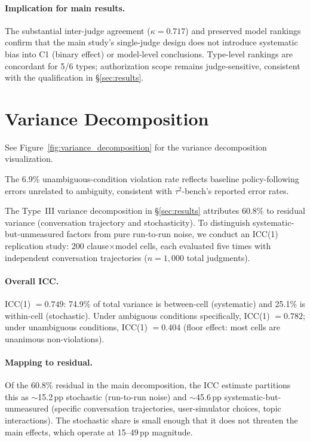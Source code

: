 \paragraph{Implication for main results.} The substantial inter-judge agreement ($\kappa = 0.717$) and preserved model rankings confirm that the main study's single-judge design does not introduce systematic bias into C1 (binary effect) or model-level conclusions. Type-level rankings are concordant for 5/6 types; authorization scope remains judge-sensitive, consistent with the qualification in \S\ref{sec:results}.

\section{Variance Decomposition}
\label{app:variance_fig}
\label{app:residual}

See Figure~\ref{fig:variance_decomposition} for the variance decomposition visualization.

The 6.9\% unambiguous-condition violation rate reflects baseline policy-following errors unrelated to ambiguity, consistent with $\tau^2$-bench's reported error rates.

The Type~III variance decomposition in \S\ref{sec:results} attributes 60.8\% to residual variance (conversation trajectory and stochasticity). To distinguish systematic-but-unmeasured factors from pure run-to-run noise, we conduct an ICC(1) replication study: 200 clause$\times$model cells, each evaluated five times with independent conversation trajectories ($n = 1{,}000$ total judgments).

\paragraph{Overall ICC.} ICC(1) $= 0.749$: 74.9\% of total variance is between-cell (systematic) and 25.1\% is within-cell (stochastic). Under ambiguous conditions specifically, ICC(1) $= 0.782$; under unambiguous conditions, ICC(1) $= 0.404$ (floor effect: most cells are unanimous non-violations).

\paragraph{Mapping to residual.} Of the 60.8\% residual in the main decomposition, the ICC estimate partitions this as $\sim$15.2\,pp stochastic (run-to-run noise) and $\sim$45.6\,pp systematic-but-unmeasured (specific conversation trajectories, user-simulator choices, topic interactions). The stochastic share is small enough that it does not threaten the main effects, which operate at 15--49\,pp magnitude.

